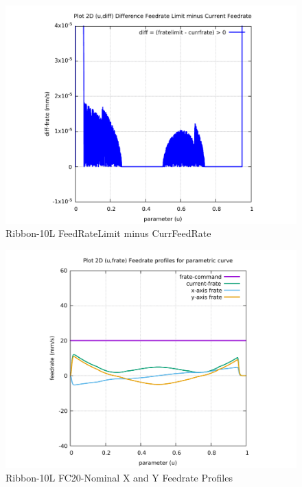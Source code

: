 \begin{figure}
	\caption     {Ribbon-10L FeedRateLimit minus CurrFeedRate}
	\label{12-img-Ribbon-10L-FeedRateLimit-minus-CurrFeedRate.pdf}
	\includegraphics[width=1.00\textwidth]{Chap4/appendix/app-Ribbon-10L/plots/12-img-Ribbon-10L-FeedRateLimit-minus-CurrFeedRate.pdf}
\end{figure}

\clearpage
\pagebreak

\begin{figure}
	\caption     {Ribbon-10L FC20-Nominal X and Y Feedrate Profiles}
	\label{13-img-Ribbon-10L-FC20-Nominal-X-and-Y-Feedrate-Profiles.pdf}
	\includegraphics[width=1.00\textwidth]{Chap4/appendix/app-Ribbon-10L/plots/13-img-Ribbon-10L-FC20-Nominal-X-and-Y-Feedrate-Profiles.pdf}
\end{figure}



